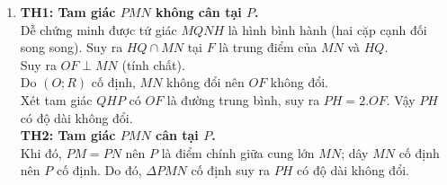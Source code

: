 \begin{ex}
{\begin{enumerate}
\item {\bf TH1: Tam giác $PMN$ không cân tại $P$.}
\\ Dễ chứng minh được tứ giác $MQNH$ là hình bình hành (hai cặp cạnh đối song song). Suy ra $HQ \cap MN$ tại $F$ là trung điểm của $MN$ và $HQ$.\\
Suy ra $OF \perp MN$ (tính chất). \\
Do $(O;R)$ cố định, $MN$ không đổi nên $OF$ không đổi.\\
Xét tam giác $QHP$ có $OF$ là đường trung bình, suy ra $PH = 2. OF$. Vậy $PH$ có độ dài không đổi.\\
{\bf TH2: Tam giác $PMN$ cân tại $P$. }\\
Khi đó, $PM=PN$ nên $P$ là điểm chính giữa cung lớn $MN$; dây $MN$ cố định nên $P$ cố định. Do đó, $\Delta PMN$ cố định suy ra $PH$ có độ dài không đổi.
\end{enumerate}

}
\end{ex}

